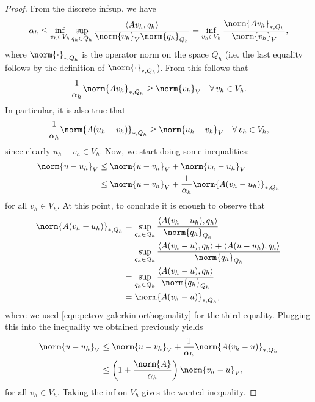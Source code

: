 \begin{proof}
    From the discrete infsup, we have
    \begin{equation*}
        \alpha_h\leq \inf_{v_h\in V_h}\sup_{q_h\in Q_h}\frac{\langle Av_h,q_h \rangle}{\norm{v_h}_V\norm{q_h}_{Q_h}}= \inf_{v_h\in V_h}\frac{\norm{Av_h}_{*,Q_h}}{\norm{v_h}_V},
    \end{equation*}
    where $\norm{\cdot}_{*,Q_h}$ is the operator norm on the space $Q_h$ (i.e. the last equality follows by the definition of $\norm{\cdot}_{*,Q_h}$). From this follows that
    \begin{equation*}
        \frac{1}{\alpha_h}\norm{Av_h}_{*,Q_h}\geq\norm{v_h}_V \quad \forall\, v_h\in V_h.
    \end{equation*}
    In particular, it is also true that
    \begin{equation*}
        \frac{1}{\alpha_h}\norm{A(u_h-v_h)}_{*,Q_h}\geq\norm{u_h-v_h}_V \quad \forall\, v_h\in V_h,
    \end{equation*}
    since clearly $u_h-v_h\in V_h$. Now, we start doing some inequalities:
    \begin{align*}
        \norm{u-u_h}_V&\leq\norm{u-v_h}_V+\norm{v_h-u_h}_V\\
        &\leq\norm{u-v_h}_V+\frac{1}{\alpha_h}\norm{A(v_h-u_h)}_{*,Q_h}
    \end{align*}
    for all $v_h\in V_h$. At this point, to conclude it is enough to observe that
    \begin{align*}
        \norm{A(v_h-u_h)}_{*,Q_h}&=\sup_{q_h\in Q_h}\frac{\langle A(v_h-u_h),q_h \rangle}{\norm{q_h}_{Q_h}}\\
        &=\sup_{q_h\in Q_h}\frac{\langle A(v_h-u),q_h \rangle + \langle A(u-u_h),q_h\rangle}{\norm{q_h}_{Q_h}}\\
        &=\sup_{q_h\in Q_h}\frac{\langle A(v_h-u),q_h \rangle}{\norm{q_h}_{Q_h}}\\
        &=\norm{A(v_h-u)}_{*,Q_h},
    \end{align*}
    where we used \eqref{eqn:petrov-galerkin orthogonality} for the third equality. Plugging this into the inequality we obtained previously yields
    \begin{align*}
        \norm{u-u_h}_V&\leq\norm{u-v_h}_V+\frac{1}{\alpha_h}\norm{A(v_h-u)}_{*,Q_h}\\
        &\leq\left( 1+\frac{\norm{A}}{\alpha_h} \right)\norm{v_h-u}_V,
    \end{align*}
    for all $v_h\in V_h$. Taking the inf on $V_h$ gives the wanted inequality.
\end{proof}


